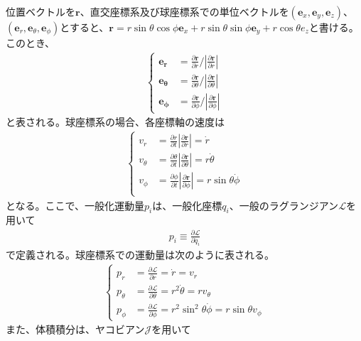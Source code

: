 位置ベクトルを$\bm r$、直交座標系及び球座標系での単位ベクトルを$(\bm e_x, \bm e_y, \bm e_z)$、$(\bm e_r, \bm e_{\theta}, \bm e_{\phi})$とすると、$\bm r = r\sin{\theta} \cos{\phi} \bm e_x + r\sin{\theta} \sin{\phi} \bm e_y + r\cos{\theta} e_z$と書ける。このとき、
\begin{align}
	\begin{cases}
		\bm{e_r} &= \frac{\partial \bm r}{\partial r} / \left| \frac{\partial \bm r}{\partial r}\right| \\
		\bm{e_{\theta}} &= \frac{\partial \bm r}{\partial \theta} / \left| \frac{\partial \bm r}{\partial \theta}\right| \\
		\bm{e_{\phi}} &= \frac{\partial \bm r}{\partial \phi} / \left| \frac{\partial \bm r}{\partial \phi}\right|
	\end{cases}
\end{align}
と表される。球座標系の場合、各座標軸の速度は
\begin{align}
	\begin{cases}
		v_r &= \frac{\partial r}{\partial t}|\frac{\partial \bm r}{\partial r}| = \dot{r}\\
		v_{\theta} &= \frac{\partial \theta}{\partial t}|\frac{\partial \bm r}{\partial \theta}| = r\dot{\theta}\\
		v_{\phi} &= \frac{\partial \phi}{\partial t}|\frac{\partial \bm r}{\partial \phi}| = r\sin\theta\dot{\phi}\\
	\end{cases}
\end{align}
となる。ここで、一般化運動量$p_i$は、一般化座標$q_i$、一般のラグランジアン$\mathcal{L}$を用いて
\begin{align}
	p_i \equiv \frac{\partial \mathcal{L}}{\partial \dot{q_i}}
\end{align}
で定義される。球座標系での運動量は次のように表される。
\begin{align}
	\begin{cases}
		p_r &= \frac{\partial \mathcal{L}}{\partial r} = \dot{r} = v_r \\
		p_{\theta} &= \frac{\partial \mathcal{L}}{\partial \theta} = r^2\dot{\theta} = r v_{\theta} \\
		p_{\phi} &= \frac{\partial \mathcal{L}}{\partial \phi} = r^2\sin^2\theta\dot{\phi} = r\sin\theta v_{\phi} \label{momenta}
	\end{cases}
\end{align}
また、体積積分は、ヤコビアン$\mathcal{J}$を用いて
